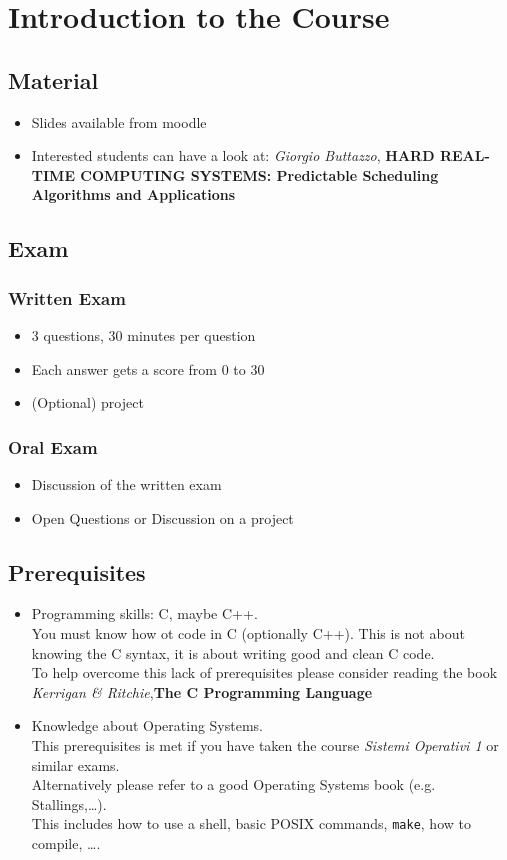 \chapter*{Introduction to the Course}
\section*{Material}
\begin{itemize}
    \item Slides available from moodle
    \item Interested students can have a look at: \textit{Giorgio Buttazzo}, \textbf{HARD REAL-TIME COMPUTING SYSTEMS: Predictable Scheduling Algorithms and Applications}
\end{itemize}
\section*{Exam}
\subsection*{Written Exam}
\begin{itemize}
    \item 3 questions, 30 minutes per question
    \item Each answer gets a score from 0 to 30
    \item (Optional) project
\end{itemize}

\subsection*{Oral Exam}
\begin{itemize}
    \item Discussion of the written exam
    \item Open Questions or Discussion on a project
\end{itemize}

\section*{Prerequisites}
\begin{itemize}
    \item Programming skills: C, maybe C++.\\
    You must know how ot code in C (optionally C++). This is not about knowing the C syntax, it is about writing good and clean C code.\\
    To help overcome this lack of prerequisites please consider reading the book \textit{Kerrigan \& Ritchie},\textbf{The C Programming Language}
    \item Knowledge about Operating Systems.\\
    This prerequisites is met if you have taken the course \textit{Sistemi Operativi 1} or similar exams.\\
    Alternatively please refer to a good Operating Systems book (e.g. Stallings,\dots).\\
    This includes how to use a shell, basic POSIX commands, \texttt{make}, how to compile, \dots.
\end{itemize}

